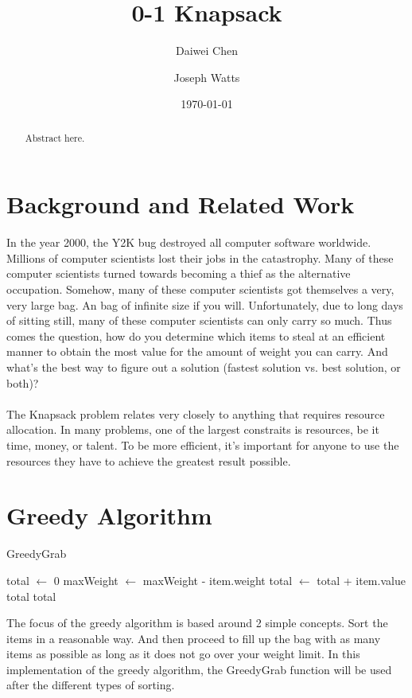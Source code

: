 \documentclass[10pt, letterpaper]{article}
\title{0-1 Knapsack}
\author{Daiwei Chen \and Joseph Watts}
\date{\today}
\begin{document}
\maketitle
\begin{abstract}
  Abstract here.
\end{abstract}

\section{Background and Related Work}
In the year 2000, the Y2K bug destroyed all computer software worldwide. Millions of computer scientists lost their jobs in the catastrophy. Many of these computer scientists turned towards becoming a thief as the alternative occupation. Somehow, many of these computer scientists got themselves a very, very large bag. An bag of infinite size if you will. Unfortunately, due to long days of sitting still, many of these computer scientists can only carry so much. Thus comes the question, how do you determine which items to steal at an efficient manner to obtain the most value for the amount of weight you can carry. And what's the best way to figure out a solution (fastest solution vs. best solution, or both)?\\
\\
The Knapsack problem relates very closely to anything that requires resource allocation. In many problems, one of the largest constraits is resources, be it time, money, or talent. To be more efficient, it's important for anyone to use the resources they have to achieve the greatest result possible.

\section{Greedy Algorithm}

\begin{algorithm}
  \begin{algorithmic}
    \caption{GreedyGrab}\label{GreedyGrab}
    \State total $\gets$ 0
    \State maxWeight $\gets$ maxWeight - item.weight
    \State total $\gets$ total + item.value
    \EndIf
    \Return total
    \EndIf
    \EndFor
    \Return total
    \EndFunction
  \end{algorithmic}
\end{algorithm}

The focus of the greedy algorithm is based around 2 simple concepts. Sort the items in a reasonable way. And then proceed to fill up the bag with as many items as possible as long as it does not go over your weight limit. In this implementation of the greedy algorithm, the GreedyGrab function will be used after the different types of sorting.
\end{document}
